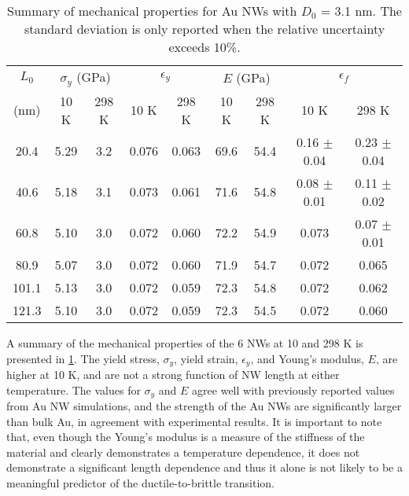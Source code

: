 \documentclass[10pt]{report}  %
\newcommand{\T}{\rule{0pt}{2.6ex}}
\newcommand{\B}{\rule[-1.2ex]{0pt}{0pt}}
\begin{document}
\begin{table} [t!]
\caption{Summary of mechanical properties for Au NWs with $D_{0}$ = 3.1 nm. The standard deviation is only reported when the relative uncertainty exceeds 10\%. }
\centering
\begin{tabular}{ c  c  c  c  c  c  c  c  c}
    \hline \hline 
$L_{0}$ \T \B & \multicolumn{2}{c}{$\sigma_{y}$ (GPa)} & \multicolumn{2}{c}{$\epsilon_{y}$} & \multicolumn{2}{c}{$E$ (GPa)} & \multicolumn{2}{c}{$\epsilon_{f}$} \\\cline{2-9}
(nm) \T \B & 10 K & 298 K & 10 K & 298 K & 10 K & 298 K & 10 K & 298 K \\
     \hline
20.4 \T \B & 5.29 & 3.2 & 0.076 & 0.063 & 69.6 & 54.4 & 0.16 $\pm$ 0.04 & 0.23 $\pm$ 0.04 \\
40.6 \T \B & 5.18 & 3.1 & 0.073 & 0.061 & 71.6 & 54.8 & 0.08 $\pm$ 0.01 & 0.11 $\pm$ 0.02 \\
60.8 \T \B & 5.10 & 3.0 & 0.072 & 0.060 & 72.2 & 54.9 & 0.073 & 0.07 $\pm$ 0.01 \\
80.9 \T \B & 5.07 & 3.0 & 0.072 & 0.060 & 71.9 & 54.7 & 0.072 & 0.065 \\
101.1 \T \B & 5.13 & 3.0 & 0.072 & 0.059 & 72.3 & 54.8 & 0.072 & 0.062 \\
121.3 \T \B & 5.10 & 3.0 & 0.072 & 0.059 & 72.3 & 54.5 & 0.072 & 0.060 \\
\hline \hline
\end{tabular}
\label{table:mechanical-summary}
\end{table}

A summary of the mechanical properties of the 6 NWs at 10 and 298 K is presented in \ref{table:mechanical-summary}. The yield stress, $\sigma_{y}$, yield strain, $\epsilon_{y}$, and Young's modulus, $E$, are higher at 10 K, and are not a strong function of NW length at either temperature.  The values for $\sigma_{y}$ and $E$ agree well with previously reported values from Au NW simulations, \cite{Park:2005,Han:2012,Koh:2006} and the strength of the Au NWs are significantly larger than bulk Au, in agreement with experimental results. \cite{Seo:2011} It is important to note that, even though the Young's modulus is a measure of the stiffness of the material and clearly demonstrates a temperature dependence, it does not demonstrate a significant length dependence and thus it alone is not likely to be a meaningful predictor of the ductile-to-brittle transition. 
\end{document}
